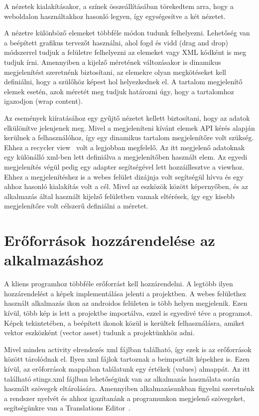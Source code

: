 \documentclass[
]{thesis-ekf}
\theoremstyle{definition}
\theoremstyle{remark}
\begin{document}
	A nézetek kialakításakor, a színek összeállításában törekedtem arra, hogy a weboldalon használtakhoz hasonló legyen, így egységesítve a két nézetet. 
	
	A nézetre különböző elemeket többféle módon tudunk felhelyezni. Lehetőség van a beépített grafikus tervezőt használni, ahol fogd és vidd (drag and drop) módszerrel tudjuk a felületre felhelyezni az elemeket vagy XML kódként is meg tudjuk írni. Amennyiben a kijelző méretének változásakor is dinamikus megjelenítést szeretnénk biztosítani, az elemekre olyan megkötéseket kell definiálni, hogy a szülőhöz képest hol helyezkednek el. A tartalom megjelenítő elemek esetén, azok méretét meg tudjuk határozni úgy, hogy a tartalomhoz igazodjon (wrap content).
	
	Az események kiíratásához egy gyűjtő nézetet kellett biztosítani, hogy az adatok elkülönítve jelenjenek meg. Mivel a megjeleníteni kívánt elemek API kérés alapján kerülnek a felhasználóhoz, így egy dinamikus tartalom megjelenítőre volt szükség. Ehhez a recycler view~\cite{android_recycler} volt a legjobban megfelelő. Az itt megjelenő adatoknak egy különálló xml-ben lett definiálva a megjelenítőben használt elem. Az egyedi megjelenítés végül pedig egy adapter segítségével lett hozzáillesztve a viewhoz. Ehhez a megjelenítéshez is a webes felület dizájnja volt segítségül hívva és egy ahhoz hasonló kialakítás volt a cél. Mivel az eszközök között képernyőben, és az alkalmazás által használt kijelző felületben vannak eltérések, így egy kisebb megjelenítőre volt célszerű definiálni a méretet.
	
	\section{Erőforrások hozzárendelése az alkalmazáshoz}
	A kliens programhoz többféle erőforrást kell hozzárendelni. A legtöbb ilyen hozzárendelést a képek implementálása jelenti a projektben. A webes felülethez használt alkalmazás ikon az androidos felületen is több helyen megjelenik. Ezen kívül, több kép is lett a projektbe importálva, ezzel is egyedivé téve a programot. Képek tekintetében, a beépített ikonok közül is kerültek felhasználásra, amiket vektor eszközként (vector asset) tudunk a projektünkhöz adni.
	
	Mivel minden activity elrendezés xml fájlban található, így ezek is az erőforrások között tárolódnak el. Ilyen xml fájlok tartoznak a beimportált képekhez is. Ezen kívül, az erőforrások mappában találatunk egy értékek (values) almappát. Az itt található stings.xml fájlban lehetőségünk van az alkalmazás használata során használt szövegek eltárolására. Amennyiben alkalmazásunkban figyelni szeretnénk a rendszer nyelvét és ahhoz igazítanánk a programunkon megjelenő szövegeket, segítségünkre van a Translations Editor~\cite{android_translations}. 
	
\end{document}
